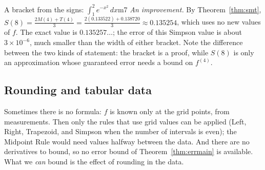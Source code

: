 \documentclass[11pt]{article}
\begin{document}
\begin{exmp}{A bracket from the signs: $\int_1^2e^{-x^2}\,dx$}{m7}
\emph{An improvement.} By Theorem~\ref{thm:smt}, $S(8)=\frac{2M(4)+T(4)}3=\frac{2(0.133522)+0.138720}3\approx0.135254$, which uses no new values of $f$. The exact value is $0.135257\ldots$; the error of this Simpson value is about $3\times10^{-6}$, much smaller than the width of either bracket. Note the difference between the two kinds of statement: the bracket is a proof, while $S(8)$ is only an approximation whose guaranteed error needs a bound on $f^{(4)}$.
\end{exmp}

\subsection*{Rounding and tabular data}

Sometimes there is no formula: $f$ is known only at the grid points, from measurements. Then only the rules that use grid values can be applied (Left, Right, Trapezoid, and Simpson when the number of intervals is even); the Midpoint Rule would need values halfway between the data. And there are no derivatives to bound, so no error bound of Theorem~\ref{thm:errmain} is available. What we \emph{can} bound is the effect of rounding in the data.
\end{document}
